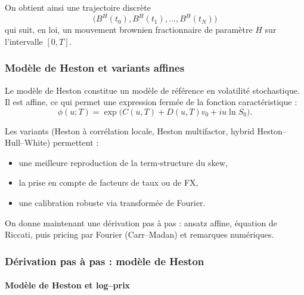 \documentclass[11pt,a4paper]{article}
\newcommand{\1}{\mathbf{1}}
\newcommand{\bH}{B^{H}}
\begin{document}
On obtient ainsi une trajectoire discrète
\[
  \bigl(\bH(t_0),\bH(t_1),\dots,\bH(t_N)\bigr)
\]
qui suit, en loi, un mouvement brownien fractionnaire de paramètre $H$
sur l'intervalle $[0,T]$.
\endgroup
\subsubsection{Mod\`ele de Heston et variants affines}

Le mod\`ele de Heston constitue un mod\`ele de r\'ef\'erence en volatilité stochastique.
Il est affine, ce qui permet une expression ferm\'ee de la fonction caract\'eristique :
\[
\phi(u;T) =
\exp \bigl(C(u,T) + D(u,T) v_0 + i u \ln S_0 \bigr).
\]

Les variants (Heston à corrélation locale, Heston multifactor, hybrid Heston--Hull--White)
permettent :
\begin{itemize}
  \item une meilleure reproduction de la term-structure du skew,
  \item la prise en compte de facteurs de taux ou de FX,
  \item une calibration robuste via transformée de Fourier.
\end{itemize}

On donne maintenant une d\'erivation pas \`a pas : ansatz affine, \'equation de Riccati,
puis pricing par Fourier (Carr--Madan) et remarques num\'eriques.

\begingroup
\let\section\subsubsection
\let\subsection\paragraph
\section{D\'erivation pas \`a pas : mod\`ele de Heston}
\label{sec:deriv-heston}



\subsection{Mod\`ele de Heston et log--prix}
\end{document}
